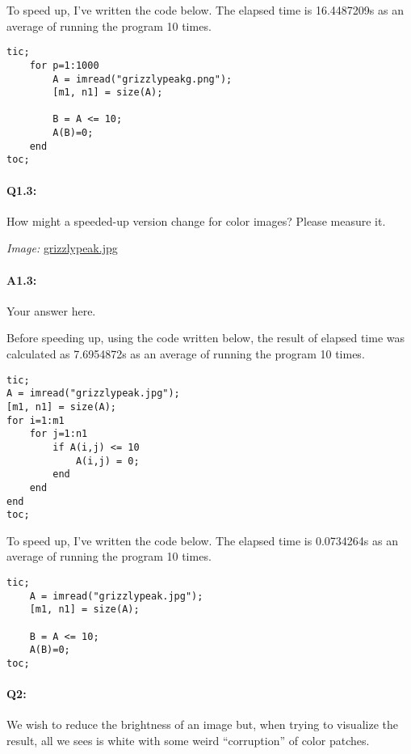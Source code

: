 \documentclass[11pt]{article}
\begin{document}
To speed up, I've written the code below. The elapsed time is 16.4487209s as an average of running the program 10 times.

\begin{lstlisting}[style=Matlab-editor]
tic;
    for p=1:1000
        A = imread("grizzlypeakg.png");
        [m1, n1] = size(A);

        B = A <= 10;
        A(B)=0;
    end
toc;
\end{lstlisting}


\pagebreak
\paragraph{Q1.3:} How might a speeded-up version change for color images? Please measure it.

\emph{Image:} \href{grizzlypeak.jpg}{grizzlypeak.jpg}

\paragraph{A1.3:} Your answer here.

Before speeding up, using the code written below, the result of elapsed time was calculated as 7.6954872s as an average of running the program 10 times.

\begin{lstlisting}[style=Matlab-editor]
tic;
A = imread("grizzlypeak.jpg");
[m1, n1] = size(A);
for i=1:m1
    for j=1:n1
        if A(i,j) <= 10
            A(i,j) = 0;
        end
    end
end 
toc;
\end{lstlisting}

To speed up, I've written the code below. The elapsed time is 0.0734264s as an average of running the program 10 times.

\begin{lstlisting}[style=Matlab-editor]
tic;
    A = imread("grizzlypeak.jpg");
    [m1, n1] = size(A);

    B = A <= 10;
    A(B)=0;
toc;
\end{lstlisting}


\pagebreak
\paragraph{Q2:} We wish to reduce the brightness of an image but, when trying to visualize the result, all we sees is white with some weird ``corruption'' of color patches.
\end{document}
